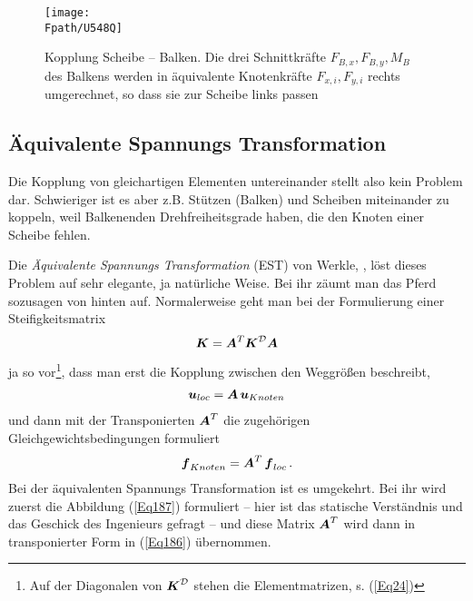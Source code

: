 {%
\begin{figure}[tbp]
\if {} \sidecaption[t] \fi
\centering
\texttt{[image: \\Fpath/U548Q]}
\caption{Kopplung Scheibe -- Balken. Die drei Schnittkr\"{a}fte $F_{B,x}, F_{B,y}, M_B$ des Balkens werden in \"{a}quivalente Knotenkr\"{a}fte $F_{x,i}, F_{y,i}$ rechts umgerechnet, so dass sie zur Scheibe links passen \cite{Werkle3} }
\label{U548}
\end{figure}%
\textcolor{chapterTitleBlue}{\section{\"{A}quivalente Spannungs Transformation}}\label{AST}
Die Kopplung von gleichartigen Elementen untereinander stellt also kein Problem dar. Schwieriger ist es aber z.B. St\"{u}tzen (Balken) und Scheiben miteinander zu koppeln, weil Balkenenden Drehfreiheitsgrade haben, die den Knoten einer Scheibe fehlen.

Die  {\em \"{A}quivalente Spannungs Transformation\/} (EST) von Werkle, \cite{Werkle1}, l\"{o}st dieses Problem auf sehr elegante, ja nat\"{u}rliche Weise. Bei ihr z\"{a}umt man das Pferd sozusagen von hinten auf. Normalerweise geht man bei der Formulierung einer Steifigkeitsmatrix
\begin{align}
\mbox{\boldmath $K$} = \mbox{\boldmath $A$}^T\mbox{\boldmath $K$}^{\mathcal{D}} \mbox{\boldmath $A$}
\end{align}
ja so vor\footnote{Auf der Diagonalen von $\mbox{\boldmath $K$}^{\mathcal{D}} $ stehen die Elementmatrizen, s. (\ref{Eq24}) }, dass man erst die Kopplung zwischen den Weggr\"{o}{\ss}en beschreibt,
\begin{align} \label{Eq186}
\mbox{\boldmath $u$}_{loc} = \mbox{\boldmath $A$}\,\mbox{\boldmath $u$}_{Knoten}
\end{align}
und dann mit der Transponierten $\mbox{\boldmath $A$}^T$ die zugeh\"{o}rigen Gleichgewichtsbedingungen formuliert
\begin{align} \label{Eq187}
\mbox{\boldmath $f$}_{Knoten} = \mbox{\boldmath $A$}^T\,\mbox{\boldmath $f$}_{loc}\,.
\end{align}
Bei der \"{a}quivalenten Spannungs Transformation ist es umgekehrt. Bei ihr wird zuerst die Abbildung (\ref{Eq187}) formuliert -- hier ist das statische Verst\"{a}ndnis und das Geschick des Ingenieurs gefragt -- und diese Matrix $\mbox{\boldmath $A$}^T$ wird dann in transponierter Form in (\ref{Eq186}) \"{u}bernommen.

}
